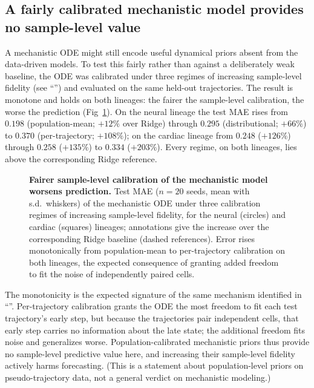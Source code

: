 \documentclass[10pt,letterpaper]{article}
\begin{document}
\subsection*{A fairly calibrated mechanistic model provides no sample-level value}
\label{subsec:res_ode}

A mechanistic ODE might still encode useful dynamical priors absent from the data-driven models. To test this fairly rather than against a deliberately weak baseline, the ODE was calibrated under three regimes of increasing sample-level fidelity (see ``'') and evaluated on the same held-out trajectories. The result is monotone and holds on both lineages: the fairer the sample-level calibration, the worse the prediction (Fig~\ref{fig:ode}). On the neural lineage the test MAE rises from $0.198$ (population-mean; $+12\%$ over Ridge) through $0.295$ (distributional; $+66\%$) to $0.370$ (per-trajectory; $+108\%$); on the cardiac lineage from $0.248$ ($+126\%$) through $0.258$ ($+135\%$) to $0.334$ ($+203\%$). Every regime, on both lineages, lies above the corresponding Ridge reference.

\begin{figure}[!h]
\caption{\textbf{Fairer sample-level calibration of the mechanistic model worsens prediction.} Test MAE ($n=20$ seeds, mean with s.d.\ whiskers) of the mechanistic ODE under three calibration regimes of increasing sample-level fidelity, for the neural (circles) and cardiac (squares) lineages; annotations give the increase over the corresponding Ridge baseline (dashed references). Error rises monotonically from population-mean to per-trajectory calibration on both lineages, the expected consequence of granting added freedom to fit the noise of independently paired cells.}
\label{fig:ode}
\end{figure}

The monotonicity is the expected signature of the same mechanism identified in ``''. Per-trajectory calibration grants the ODE the most freedom to fit each test trajectory's early step, but because the trajectories pair independent cells, that early step carries no information about the late state; the additional freedom fits noise and generalizes worse. Population-calibrated mechanistic priors thus provide no sample-level predictive value here, and increasing their sample-level fidelity actively harms forecasting. (This is a statement about population-level priors on pseudo-trajectory data, not a general verdict on mechanistic modeling.)
\end{document}
